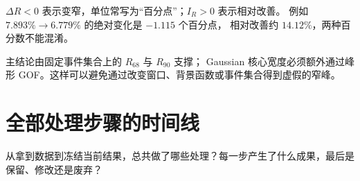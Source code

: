 \documentclass[UTF8,12pt,a4paper,oneside,fontset=none]{ctexart}
\numberwithin{equation}{section}
\newcommand{\Rsixtyeight}{R_{68}}
\newcommand{\Rninety}{R_{90}}
\begin{document}
\(\Delta R<0\) 表示变窄，单位常写为“百分点”；\(I_R>0\) 表示相对改善。
例如 \(7.893\%\rightarrow6.779\%\) 的绝对变化是 \(-1.115\) 个百分点，
相对改善约 \(14.12\%\)，两种百分数不能混淆。

\begin{conclusionbox}
主结论由固定事件集合上的 \(\Rsixtyeight\) 与 \(\Rninety\) 支撑；
Gaussian 核心宽度必须额外通过峰形 GOF。这样可以避免通过改变窗口、背景函数或事件集合得到虚假的窄峰。
\end{conclusionbox}

\section{全部处理步骤的时间线}
\label{sec:timeline}

\begin{questionbox}
从拿到数据到冻结当前结果，总共做了哪些处理？每一步产生了什么成果，最后是保留、修改还是废弃？
\end{questionbox}
\end{document}
